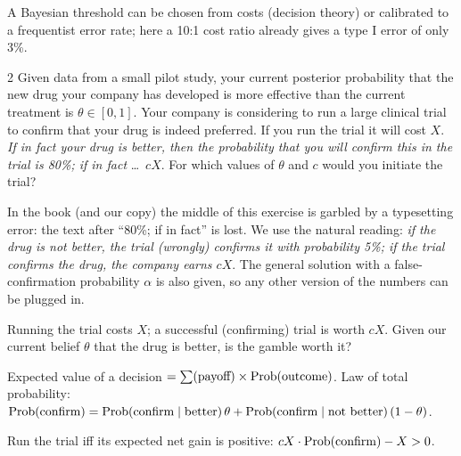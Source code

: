 \documentclass[11pt]{article}
\begin{document}
\begin{takeaway}
A Bayesian threshold can be chosen from costs (decision theory) or calibrated to a frequentist error rate; here a 10:1 cost ratio already gives a type I error of only 3\%.
\end{takeaway}


\begin{problem}{2}
Given data from a small pilot study, your current posterior probability that the new drug your company has developed is more effective than the current treatment is $\theta\in[0,1]$. Your company is considering to run a large clinical trial to confirm that your drug is indeed preferred. If you run the trial it will cost $X$. \emph{If in fact your drug is better, then the probability that you will confirm this in the trial is 80\%; if in fact} \dots\ $cX$. For which values of $\theta$ and $c$ would you initiate the trial?
\end{problem}

\begin{note}
In the book (and our copy) the middle of this exercise is garbled by a typesetting error: the text after ``80\%; if in fact'' is lost. We use the natural reading: \emph{if the drug is not better, the trial (wrongly) confirms it with probability 5\%; if the trial confirms the drug, the company earns $cX$}. The general solution with a false-confirmation probability $\alpha$ is also given, so any other version of the numbers can be plugged in.
\end{note}

\begin{restate}
Running the trial costs $X$; a successful (confirming) trial is worth $cX$. Given our current belief $\theta$ that the drug is better, is the gamble worth it?
\end{restate}

\begin{recall}
Expected value of a decision $=\sum(\text{payoff})\times\mathrm{Prob}(\text{outcome})$. Law of total probability: $\mathrm{Prob}(\text{confirm})=\mathrm{Prob}(\text{confirm}\mid\text{better})\,\theta+\mathrm{Prob}(\text{confirm}\mid\text{not better})\,(1-\theta)$.
\end{recall}

\begin{keyidea}
Run the trial iff its expected net gain is positive: $cX\cdot\mathrm{Prob}(\text{confirm})-X>0$.
\end{keyidea}
\end{document}

